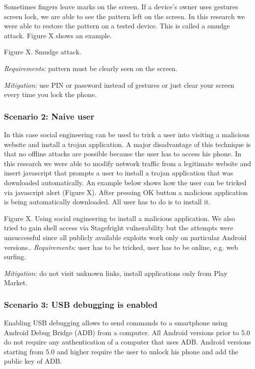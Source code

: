 Sometimes fingers leave marks on the screen. If a device’s owner uses gestures screen lock, we are able to see the pattern left on the screen. In this research we were able to restore the pattern on a tested device. This is called a smudge attack. Figure X shows an example.

Figure X. Smudge attack.


\textsl{Requirements:} pattern must be clearly seen on the screen.

\textsl{Mitigation:} use PIN or password instead of gestures or just clear your screen every time you lock the phone.


\subsubsection{Scenario 2: Naive user}
In this case social engineering can be used to trick a user into visiting a malicious website and install a trojan application. A major disadvantage of this technique is that no offline attacks are possible because the user has to access his phone. In this research we were able to modify network traffic from a legitimate website and insert javascript that prompts a user to install a trojan application that was downloaded automatically.
An example below shows how the user can be tricked via javascript alert (Figure X). After pressing OK button a malicious application is being automatically downloaded. All user has to do is to install it.

Figure X. Using social engineering to install a malicious application.
We also tried to gain shell access via Stagefright vulnerability but the attempts were unsuccessful since all publicly available exploits work only on particular Android versions..
\textsl{Requirements:} user has to be tricked, user has to be online, e.g. web surfing.

\textsl{Mitigation:} do not visit unknown links, install applications only from Play Market.


\subsubsection{Scenario 3: USB debugging is enabled}

Enabling USB debugging allows to send commands to a smartphone using Android Debug Bridge (ADB) from a computer.  All Android versions prior to 5.0 do not require any authentication of a computer that uses ADB. Android versions starting from 5.0 and higher require the user to unlock his phone and add the public key of ADB.

